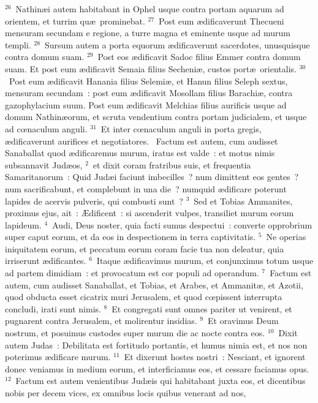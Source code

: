 ${}^{26}$~Nathin\ae i autem habitabant in Ophel usque contra portam aquarum ad orientem, et turrim qu\ae\ prominebat.
${}^{27}$~Post eum \ae dificaverunt Thecueni mensuram secundam e regione, a turre magna et eminente usque ad murum templi.
${}^{28}$~Sursum autem a porta equorum \ae dificaverunt sacerdotes, unusquisque contra domum suam.
${}^{29}$~Post eos \ae dificavit Sadoc filius Emmer contra domum suam. Et post eum \ae dificavit Semaia filius Secheni\ae , custos port\ae\ orientalis.
${}^{30}$~Post eum \ae dificavit Hanania filius Selemi\ae , et Hanun filius Seleph sextus, mensuram secundam~: post eum \ae dificavit Mosollam filius Barachi\ae , contra gazophylacium suum. Post eum \ae dificavit Melchias filius aurificis usque ad domum Nathin\ae orum, et scruta vendentium contra portam judicialem, et usque ad cœnaculum anguli.
${}^{31}$~Et inter cœnaculum anguli in porta gregis, \ae dificaverunt aurifices et negotiatores.
~Factum est autem, cum audisset Sanaballat quod \ae dificaremus murum, iratus est valde~: et motus nimis subsannavit Jud\ae os,
${}^{2}$~et dixit coram fratribus suis, et frequentia Samaritanorum~: Quid Jud\ae i faciunt imbecilles~? num dimittent eos gentes~? num sacrificabunt, et complebunt in una die~? numquid \ae dificare poterunt lapides de acervis pulveris, qui combusti sunt~?
${}^{3}$~Sed et Tobias Ammanites, proximus ejus, ait~: \AE dificent~: si ascenderit vulpes, transiliet murum eorum lapideum.
${}^{4}$~Audi, Deus noster, quia facti sumus despectui~: converte opprobrium super caput eorum, et da eos in despectionem in terra captivitatis.
${}^{5}$~Ne operias iniquitatem eorum, et peccatum eorum coram facie tua non deleatur, quia irriserunt \ae dificantes.
${}^{6}$~Itaque \ae dificavimus murum, et conjunximus totum usque ad partem dimidiam~: et provocatum est cor populi ad operandum.
${}^{7}$~Factum est autem, cum audisset Sanaballat, et Tobias, et Arabes, et Ammanit\ae , et Azotii, quod obducta esset cicatrix muri Jerusalem, et quod cœpissent interrupta concludi, irati sunt nimis.
${}^{8}$~Et congregati sunt omnes pariter ut venirent, et pugnarent contra Jerusalem, et molirentur insidias.
${}^{9}$~Et oravimus Deum nostrum, et posuimus custodes super murum die ac nocte contra eos.
${}^{10}$~Dixit autem Judas~: Debilitata est fortitudo portantis, et humus nimia est, et nos non poterimus \ae dificare murum.
${}^{11}$~Et dixerunt hostes nostri~: Nesciant, et ignorent donec veniamus in medium eorum, et interficiamus eos, et cessare faciamus opus.
${}^{12}$~Factum est autem venientibus Jud\ae is qui habitabant juxta eos, et dicentibus nobis per decem vices, ex omnibus locis quibus venerant ad nos,
